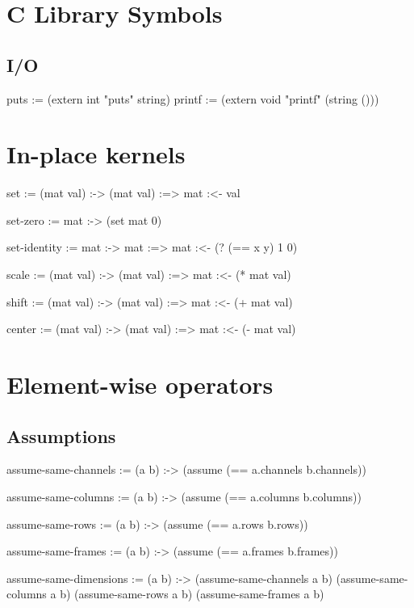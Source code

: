 \documentclass[twoside=false, numbers=noenddot]{scrbook}
\newenvironment{likely}
{ \verbatim }
{ \endverbatim }
\begin{document}
\chapter{C Library Symbols}
\section{I/O}
\begin{likely}
puts := (extern int "puts" string)
printf := (extern void "printf" (string ()))
\end{likely}

\chapter{In-place kernels}
\begin{likely}
set :=
  (mat val) :->
    (mat val) :=>
      mat :<- val

set-zero :=
  mat :->
    (set mat 0)

set-identity :=
  mat :->
    mat :=>
      mat :<- (? (== x y) 1 0)

scale :=
  (mat val) :->
    (mat val) :=>
      mat :<- (* mat val)

shift :=
  (mat val) :->
    (mat val) :=>
      mat :<- (+ mat val)

center :=
  (mat val) :->
    (mat val) :=>
      mat :<- (- mat val)
\end{likely}

\chapter{Element-wise operators}

\section{Assumptions}
\begin{likely}
assume-same-channels :=
  (a b) :->
    (assume (== a.channels b.channels))

assume-same-columns :=
  (a b) :->
    (assume (== a.columns b.columns))

assume-same-rows :=
  (a b) :->
    (assume (== a.rows b.rows))

assume-same-frames :=
  (a b) :->
    (assume (== a.frames b.frames))

assume-same-dimensions :=
  (a b) :->
  {
    (assume-same-channels a b)
    (assume-same-columns  a b)
    (assume-same-rows     a b)
    (assume-same-frames   a b)
  }
\end{likely}
\end{document}

